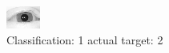 \begin{figure}[h!]
\begin{center}
\includegraphics[width=0.60\columnwidth]{figures/ID3076_class_1_target_2.png}
\end{center}
\caption{ Classification: 1 actual target: 2}
\label{fig:ID3076_class_1_target_2}
\end{figure}
